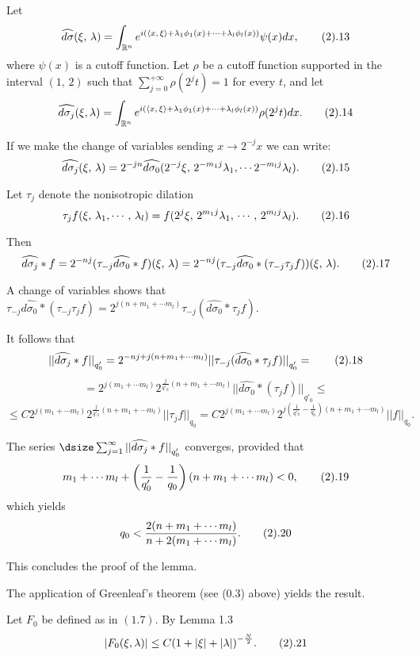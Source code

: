  Let 
$$ \widehat {d\sigma}(\xi,\,\lambda) =
\int_{  {\Bbb R}^n}
e^{i(
\langle x,\,\xi\rangle +\lambda_1\phi_1(x)+\cdots +\lambda_l\phi_l(x)
)}
\psi(x)dx, \tag2.13$$
where $\psi(x) $ is a cutoff function. 
Let $\rho$ be a cutoff function supported in the 
interval $(1,\,2)$ such that $\sum_{j=0}^{+\infty} \rho(2^jt) =1$ 
for every $t$, and let
$$\widehat{d\sigma_j}( \xi, \lambda) =
\int_{  {\Bbb R}^n}
e^{i(
\langle x,\,\xi\rangle +\lambda_1\phi_1(x)+\cdots +\lambda_l\phi_l(x)
)}
\rho(2^jt)dx. \tag2.14$$

If we make the change of variables sending $x \to 2^{-j}x$ we can write:
$$ \widehat{d\sigma_j}(\xi,\,\lambda)= 
2^{-jn}  \widehat{d\sigma_0}(2^{-j}\xi, \,2^{-m_1j}\lambda_1,\cdots  
2^{-m_lj}\lambda_l). \tag2.15$$

Let $\tau_j$ denote the nonisotropic dilation
$$ \tau_j f(\xi,\,\lambda_1,\cdots,\,\lambda_l)=
f(2^j\xi,\,2^{m_1j}\lambda_1,\,\cdots ,\, 2^{m_lj}\lambda_l). \tag2.16$$

Then
$$ \widehat{d\sigma_j}*f= 
2^{-nj}( \tau_{-j}  \widehat{d\sigma_0}*f)(\xi,\,\lambda)=
2^{-nj}( \tau_{-j}  \widehat{d\sigma_0}*( \tau_{-j} 
\tau_jf))(\xi,\,\lambda). \tag2.17$$

A change of variables shows that 
$ \tau_{-j}  \widehat{d\sigma_0}*(\tau_{-j} \tau_jf)=
2^{j(n+m_1+\cdots m_l)} \tau_{-j}(\widehat{d\sigma_0}*\tau_jf).$

It follows that 
$${||{  \widehat{d\sigma_j}*f}||}_{q'_0}= 
2^{-nj+ j(n+m_1+\cdots m_l)}
{||{ \tau_{-j}(\widehat{d\sigma_0}*\tau_jf)}||}_{q'_0}= \tag2.18$$
$$=2^{j(m_1+\cdots m_l)}
2^{\frac{j}{q'_0} (n+m_1+\cdots m_l)}
{||{  \widehat{d\sigma_0}*( \tau_jf)}||}_{q'_0}\leq$$
$$\leq C 2^{j(m_1+\cdots m_l)}
2^{\frac{j}{q'_0} (n+m_1+\cdots m_l)}
{||{ \tau_jf}||}_{q_0}= 
C2^{j(m_1+\cdots m_l)}
2^{j\left(\frac{1}{q'_0}-\frac{1}{q_0}\right) (n+m_1+\cdots m_l)}
{||{f}||}_{q_0}.$$

The series $\dsize
\sum_{j=1}^{\infty}{||{\widehat{d\sigma_j}*f}||}_{q'_0}$ converges,  provided that 
$$m_1+\cdots m_l +
\left(\frac{1}{q'_0}-\frac{1}{q_0}\right) (n+m_1+\cdots m_l)<0, \tag2.19$$
which  yields
$$q_0< \frac{ 2(n+m_1+\cdots m_l)}{n+2(m_1+\cdots m_l)}. \tag2.20$$

This concludes the proof of the lemma.
\enddemo

 The application of Greenleaf's theorem (see (0.3)
above) yields the result. 
\enddemo

 Let $F_0$ be defined as in $(1.7)$. By Lemma 1.3 
$$ |F_0(\xi,\lambda)| \leq C{(1+|\xi|+|\lambda|)}^{-\frac{N}{2}}. \tag2.21$$ 

